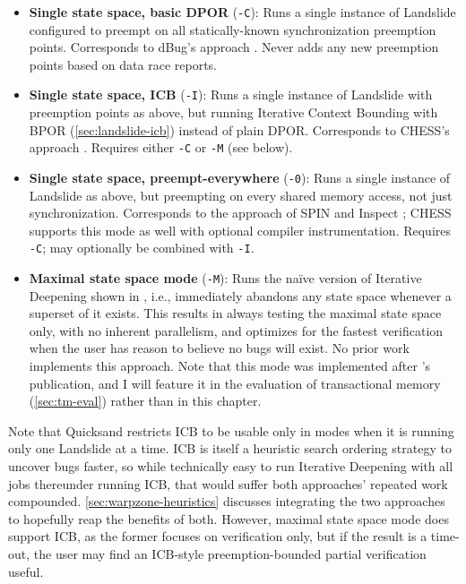 \begin{itemize}
	\item {\bf Single state space, basic DPOR} ({\tt -C}):
		Runs a single instance of Landslide configured to preempt
		on all statically-known synchronization preemption points.
		Corresponds to dBug's approach \cite{dbug-ssv}.
		Never adds any new preemption points based on data race reports.
	\item {\bf Single state space, ICB} ({\tt -I}):
		Runs a single instance of Landslide with preemption points as above,
		but running Iterative Context Bounding with BPOR (\cref{sec:landslide-icb})
		instead of plain DPOR.
		Corresponds to CHESS's approach \cite{chess}.
		Requires either {\tt -C} or {\tt -M} (see below).
	\item {\bf Single state space, preempt-everywhere} ({\tt -0}):
		Runs a single instance of Landslide as above,
		but preempting on every shared memory access, not just synchronization.
		Corresponds to the approach of SPIN \cite{spin} and Inspect \cite{inspect};
		CHESS supports this mode as well with optional compiler instrumentation.
		Requires {\tt -C}; may optionally be combined with {\tt -I}.
	\item {\bf Maximal state space mode} ({\tt -M}):
		Runs the na\"{i}ve version of Iterative Deepening shown in ,
		i.e.,
		immediately abandons any state space whenever a superset of it exists.
		This results in always testing the maximal state space only, with no inherent parallelism,
		and optimizes for the fastest verification when the user has reason to believe no bugs will exist.
		No prior work implements this approach.
		Note that this mode was implemented after \cite{quicksand}'s publication,
		and I will feature it in the evaluation of transactional memory
		(\cref{sec:tm-eval}) rather than in this chapter.
\end{itemize}

Note that Quicksand restricts ICB to be usable only in modes when it is running only one Landslide at a time.
ICB is itself a heuristic search ordering strategy to uncover bugs faster,
so while technically easy to run Iterative Deepening with all jobs thereunder running ICB,
that would suffer both approaches' repeated work compounded.
\cref{sec:warpzone-heuristics} discusses integrating the two approaches to hopefully reap the benefits of both.
However, maximal state space mode does support ICB,
as the former focuses on verification only,
but if the result is a time-out,
the user may find an ICB-style preemption-bounded partial verification useful.

